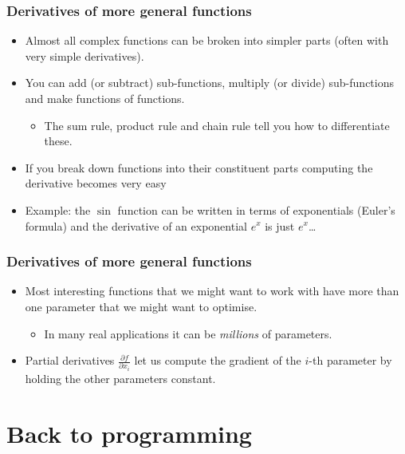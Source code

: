 \documentclass[]{article}
\begin{document}
\begin{frame}
\frametitle{Derivatives of more general functions}

\begin{itemize}
	\item<1-> Almost all complex functions can be broken into simpler parts (often with very simple derivatives).
	\item<1-> You can add (or subtract) sub-functions, multiply (or divide) sub-functions and make functions of functions.
	\begin{itemize}
		\item The sum rule, product rule and chain rule tell you how to differentiate these.
	\end{itemize}
	\item<2-> If you break down functions into their constituent parts computing the derivative becomes very easy
	\item<2-> Example: the $\sin$ function can be written in terms of exponentials (Euler's formula) and the derivative of an exponential $e^x$ is just $e^x$\dots
\end{itemize}
\end{frame}

\begin{frame}
\frametitle{Derivatives of more general functions}

\begin{itemize}
	\item<1-> Most interesting functions that we might want to work with have more than one parameter that we might want to optimise.
	\begin{itemize}
		\item<1-> In many real applications it can be \emph{millions} of parameters.
	\end{itemize}
	\item<2-> Partial derivatives $\frac{\partial f}{\partial x_i}$ let us compute the gradient of the $i$-th parameter by holding the other parameters constant.
\end{itemize}
\end{frame}

\section{Back to programming}
\end{document}
